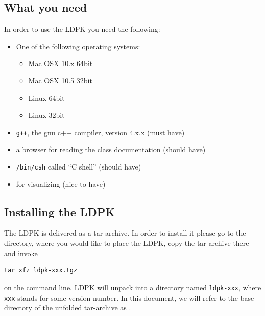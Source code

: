 \documentclass[10pt,a4paper]{article}
\begin{document}
\subsection{What you need}
In order to use the LDPK you need the following:
\begin{itemize}
\item One of the following operating systems:
\begin{itemize}
\item Mac OSX 10.x 64bit
\item Mac OSX 10.5 32bit
\item Linux 64bit
\item Linux 32bit
\end{itemize}
\item {\tt g++}, the gnu c++ compiler, version 4.x.x (must have)
\item a browser for reading the class documentation (should have)
\item {\tt /bin/csh} called ``C shell'' (should have)
\item {\tt \gnuplot} for visualizing (nice to have)
\end{itemize}
%
\subsection{Installing the LDPK}
The LDPK is delivered as a tar-archive. In order to install it please go to the directory,
where you would like to place the LDPK, copy the tar-archive there and invoke
\begin{verbatim}
tar xfz ldpk-xxx.tgz
\end{verbatim}
on the command line. LDPK will unpack into a directory
named {\tt ldpk-xxx}, where {\tt xxx} stands for some version number.
In this document, we will refer to the base directory of the unfolded tar-archive as \ldpk.
%
\end{document}
